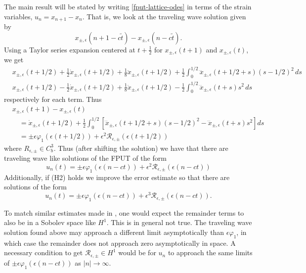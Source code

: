 The main result will be stated by writing \cref{fput-lattice-odes} in terms of the strain variables, \(u_n = x_{n+1} - x_n\). That is, we look at the traveling wave solution given by 
\begin{equation*}
	x_{\pm, \epsilon}(n+1-c\tilde t) - x_{\pm, \epsilon}(n-c\tilde t).
\end{equation*}
Using a Taylor series expansion centered at \(t + \frac 12 \) for \( x_{\pm, \epsilon}(t+ 1)\) and \( x_{\pm, \epsilon}(t)\), we get 
\begin{align}
	& x_{\pm, \epsilon}(t+ 1/2) + \frac 12 \dot x_{\pm, \epsilon}(t+1/2) + \frac 1 8\ddot x_{\pm, \epsilon}(t+1/2) + \frac 1 2\int_{0}^{1/2} \dddot x_{\pm, \epsilon}(t+1/2+s)(s-1/2)^2 \, ds \\
	& x_{\pm, \epsilon}(t+ 1/2) - \frac 12 \dot x_{\pm, \epsilon}(t+1/2) + \frac 1 8 \ddot x_{\pm, \epsilon}(t+1/2) - \frac 1 2\int_0^{1/2} \dddot x_{\pm, \epsilon}(t+s)s^2 \, ds 
\end{align}
respectively for each term. Thus 
\begin{equation*}
\begin{aligned}
	&x_{\pm, \epsilon}(t+1) - x_{\pm, \epsilon}(t) \\
	&\quad= \dot x_{\pm, \epsilon}(t+ 1/2) + \frac 12 \int_{0}^{1/2} [\dddot x_{\pm, \epsilon}(t+1/2+s)(s-1/2)^2 - \dddot x_{\pm, \epsilon}(t+s)s^2] ds \\
	&\quad= \pm \epsilon \varphi_1(\epsilon (t+1/2)) + \epsilon^2 \mathcal R_{\epsilon, \pm}(\epsilon (t+1/2))
\end{aligned}
\end{equation*}
where \(R_{\epsilon, \pm} \in C^3_b\). Thus (after shifting the solution) we have that there are traveling wave like solutions of the FPUT of the form
\begin{equation*}
	u_n(t) = \pm \epsilon \varphi_1(\epsilon(n-ct)) + \epsilon^2 \mathcal R_{\epsilon, \pm}(\epsilon (n-ct))
\end{equation*}
Additionally, if (H2) holds we improve the error estimate so that there are solutions of the form 
\begin{equation*}
	u_n(t) = \pm \epsilon \varphi_1(\epsilon(n-ct)) + \epsilon^3 \mathcal R_{\epsilon, \pm}(\epsilon (n-ct)).
\end{equation*}

To match similar estimates made in \cite{friesecke1999solitary}, one would expect the remainder terms to also be in a Sobolev space like \(H^1\). This is in general not true. The traveling wave solution found above may approach a different limit asymptotically than \(\epsilon \varphi_1 \), in which case the remainder does not approach zero asymptotically in space. A necessary condition to get \(\mathcal R_{\epsilon,\pm}\in H^1\) would be for \(u_n\) to approach the same limits of \(\pm \epsilon \varphi_1(\epsilon (n-ct))\) as \(|n| \to \infty\).

